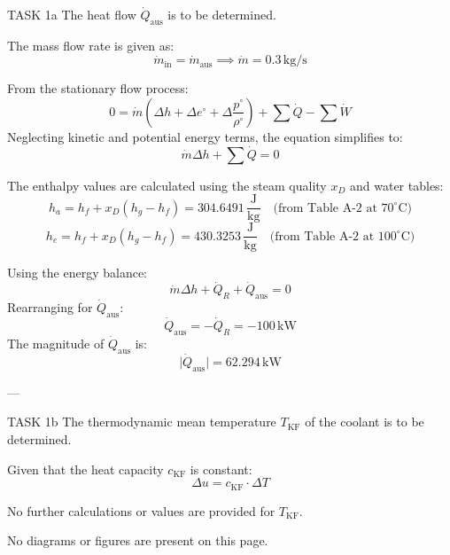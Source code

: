 TASK 1a  
The heat flow \( \dot{Q}_{\text{aus}} \) is to be determined.  

The mass flow rate is given as:  
\[
\dot{m}_{\text{in}} = \dot{m}_{\text{aus}} \implies \dot{m} = 0.3 \, \text{kg/s}
\]  

From the stationary flow process:  
\[
0 = \dot{m} \left( \Delta h + \Delta e^{\circ} + \Delta \frac{p^{\circ}}{\rho^{\circ}} \right) + \sum \dot{Q} - \sum \dot{W}
\]  
Neglecting kinetic and potential energy terms, the equation simplifies to:  
\[
\dot{m} \Delta h + \sum \dot{Q} = 0
\]  

The enthalpy values are calculated using the steam quality \( x_D \) and water tables:  
\[
h_a = h_f + x_D (h_g - h_f) = 304.6491 \, \frac{\text{J}}{\text{kg}} \quad \text{(from Table A-2 at } 70^\circ\text{C})
\]  
\[
h_e = h_f + x_D (h_g - h_f) = 430.3253 \, \frac{\text{J}}{\text{kg}} \quad \text{(from Table A-2 at } 100^\circ\text{C})
\]  

Using the energy balance:  
\[
\dot{m} \Delta h + \dot{Q}_R + \dot{Q}_{\text{aus}} = 0
\]  
Rearranging for \( \dot{Q}_{\text{aus}} \):  
\[
\dot{Q}_{\text{aus}} = -\dot{Q}_R = -100 \, \text{kW}
\]  
The magnitude of \( \dot{Q}_{\text{aus}} \) is:  
\[
\lvert \dot{Q}_{\text{aus}} \rvert = 62.294 \, \text{kW}
\]  

---

TASK 1b  
The thermodynamic mean temperature \( T_{\text{KF}} \) of the coolant is to be determined.  

Given that the heat capacity \( c_{\text{KF}} \) is constant:  
\[
\Delta u = c_{\text{KF}} \cdot \Delta T
\]  

No further calculations or values are provided for \( T_{\text{KF}} \).  

No diagrams or figures are present on this page.